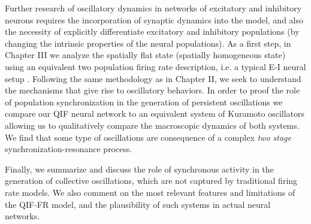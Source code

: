 Further research of oscillatory dynamics in networks of excitatory and
inhibitory neurons requires the incorporation of synaptic dynamics into
the model, and also the necessity of explicitly differentiate  excitatory and
inhibitory populations (by changing the intrinsic properties of the
neural populations). As a first step, in Chapter III we analyze the spatially
flat state (spatially homogeneous state) using an equivalent two population firing rate
description, i.e. a typical E-I neural setup \citep{Wilson1972}.
Following the same methodology as in Chapter II, we seek to
understand the mechanisms that give rise to oscillatory behaviors.
In order to proof the role of
population synchronization in the generation of persistent
oscillations we compare our QIF neural network to an equivalent system of
Kuramoto oscillators allowing us to qualitatively compare the
macroscopic dynamics of both systems. We find that some type of
oscillations are consequence of a complex \textit{two stage}
synchronization-resonance process. 


Finally, we summarize and discuss the
role of synchronous activity in the generation of collective
oscillations, 
which are not captured by  traditional firing rate
models. We also comment on the most relevant features and limitations
of the QIF-FR model, and the plausibility of such systems in actual
neural networks.

\cleardoublepage

